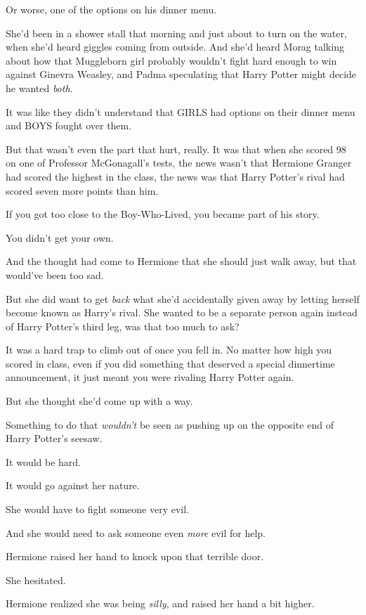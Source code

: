 Or worse, one of the options on his dinner menu.

She'd been in a shower stall that morning and just about to turn on the
water, when she'd heard giggles coming from outside. And she'd heard
Morag talking about how that Muggleborn girl probably wouldn't fight
hard enough to win against Ginevra Weasley, and Padma speculating that
Harry Potter might decide he wanted \emph{both}.

It was like they didn't understand that GIRLS had options on their
dinner menu and BOYS fought over them.

But that wasn't even the part that hurt, really. It was that when she
scored 98 on one of Professor McGonagall's tests, the news wasn't that
Hermione Granger had scored the highest in the class, the news was that
Harry Potter's rival had scored seven more points than him.

If you got too close to the Boy-Who-Lived, you became part of his story.

You didn't get your own.

And the thought had come to Hermione that she should just walk away, but
that would've been too sad.

But she did want to get \emph{back} what she'd accidentally given away
by letting herself become known as Harry's rival. She wanted to be a
separate person again instead of Harry Potter's third leg, was that too
much to ask?

It was a hard trap to climb out of once you fell in. No matter how high
you scored in class, even if you did something that deserved a special
dinnertime announcement, it just meant you were rivaling Harry Potter
again.

But she thought she'd come up with a way.

Something to do that \emph{wouldn't} be seen as pushing up on the
opposite end of Harry Potter's seesaw.

It would be hard.

It would go against her nature.

She would have to fight someone very evil.

And she would need to ask someone even \emph{more} evil for help.

Hermione raised her hand to knock upon that terrible door.

She hesitated.

Hermione realized she was being \emph{silly}, and raised her hand a bit
higher.

